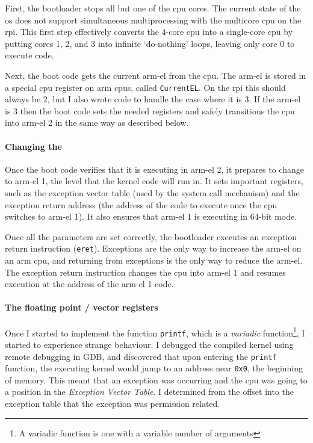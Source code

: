 \documentclass{article}
\begin{document}
First, the bootloader stops all but one of the \gls{cpu} cores. The current
state of the \gls{os} does not support simultaneous multiprocessing with the
multicore \gls{cpu} on the \gls{rpi}. This first step effectively converts the
4-core \gls{cpu} into a single-core \gls{cpu} by putting cores 1, 2, and 3 into
infinite `do-nothing' loops, leaving only core 0 to execute code.

Next, the boot code gets the current \gls{arm-el} from the \gls{cpu}. The
\gls{arm-el} is stored in a special \gls{cpu} register on \gls{arm}
\glspl{cpu}, called \verb!CurrentEL!. On the \gls{rpi} this should always be 2,
but I also wrote code to handle the case where it is 3. If the \gls{arm-el} is
3 then the boot code sets the needed registers and safely transitions the
\gls{cpu} into \gls{arm-el} 2 in the same way as described below.

\paragraph{Changing the \texorpdfstring{}{Exception Level}}
Once the boot code verifies that it is executing in \gls{arm-el} 2, it prepares
to change to \gls{arm-el} 1, the level that the kernel code will run in. It
sets important registers, such as the exception vector table (used by the
system call mechanism) and the exception return address (the address of the
code to execute once the \gls{cpu} switches to \gls{arm-el} 1). It also ensures
that \gls{arm-el} 1 is executing in 64-bit mode.

Once all the parameters are set correctly, the bootloader executes an exception
return instruction (\verb!eret!). Exceptions are the only way to increase the
\gls{arm-el} on an \gls{arm} \gls{cpu}, and returning from exceptions is the
only way to reduce the \gls{arm-el}. The exception return instruction changes
the \gls{cpu} into \gls{arm-el} 1 and resumes execution at the address of the
\gls{arm-el} 1 code.

\paragraph{The floating point / vector registers}
Once I started to implement the function \verb!printf!, which is a
\emph{variadic} function\footnote{A variadic function is one with a variable
number of arguments}, I started to experience strange behaviour. I debugged the
compiled kernel using remote debugging in GDB, and discovered that upon
entering the \verb!printf! function, the executing kernel would jump to an
address near \texttt{0x0}, the beginning of memory. This meant that an
exception was occurring and the \gls{cpu} was going to a position in the
\emph{Exception Vector Table}. I determined from the offset into the exception
table that the exception was permission related.
\end{document}

